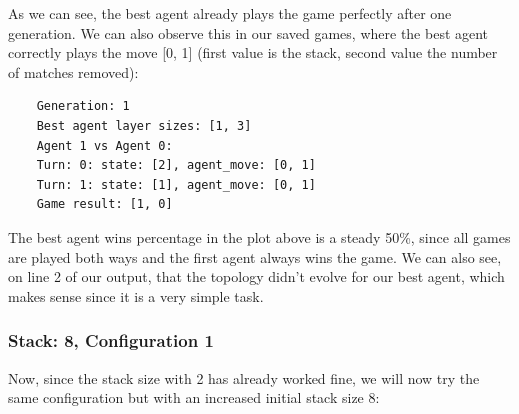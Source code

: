 \documentclass[11pt]{report}
\begin{document}
\begin{enumerate}
\begin{center}
    \end{center}

    As we can see, the best agent already plays the game perfectly after one generation.
    We can also observe this in our saved games, where the best agent correctly plays the move [0, 1] (first value is the stack, second value the number of matches removed):
    \begin{verbatim}
    Generation: 1
    Best agent layer sizes: [1, 3]
    Agent 1 vs Agent 0:
    Turn: 0: state: [2], agent_move: [0, 1]
    Turn: 1: state: [1], agent_move: [0, 1]
    Game result: [1, 0]
    \end{verbatim}
    The best agent wins percentage in the plot above is a steady 50\%, since all games are played both ways and the first agent always wins the game.
    We can also see, on line 2 of our output, that the topology didn't evolve for our best agent, which makes sense since it is a very simple task.
            \subsubsection{Stack: 8, Configuration 1}
    Now, since the stack size with 2 has already worked fine, we will now try the same configuration but with an increased initial stack size 8:
    \\
    \renewcommand{\csvpath}{../data/simple_nim/stack_8/t_1/stats.csv} %
    \begin{center}
\end{center}
\end{enumerate}
\end{document}

